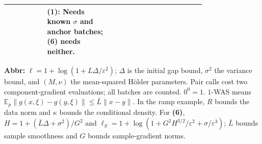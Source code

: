 \begin{table}[tp]
\begin{threeparttable}
\begin{tabularx}{\linewidth}{@{}>{\raggedright\arraybackslash}p{0.20\linewidth}>{\raggedright\arraybackslash}p{0.32\linewidth}>{\raggedright\arraybackslash}p{0.25\linewidth}>{\raggedright\arraybackslash}X@{}}
& \textbf{(1)}: Needs known $\sigma$ and anchor batches; \textbf{(6)} needs neither. \\
\bottomrule
\end{tabularx}
\begin{tablenotes}[flushleft]\footnotesize
\item[] \textbf{Abbr:} $\ell=1+\log(1+L\Delta/\varepsilon^2)$; $\Delta$ is the initial gap bound, $\sigma^2$ the variance bound, and $(M,\nu)$ the mean-squared H\"older parameters. Pair calls cost two component-gradient evaluations; all batches are counted. $0^0=1$. $1$-WAS means $\mathbb E_p\|g(x,\xi)-g(y,\xi)\|\le\bar L\|x-y\|$. In the ramp example, $R$ bounds the data norm and $\kappa$ bounds the conditional density. For \textbf{(6)}, $H=1+(\bar L\Delta+\sigma^2)/G^2$ and $\ell_S=1+\log(1+G^2H^{3/2}/\varepsilon^2+\sigma/\varepsilon^3)$; $\bar L$ bounds sample smoothness and $G$ bounds sample-gradient norms.
\end{tablenotes}
\end{threeparttable}
\end{table}
\clearpage
